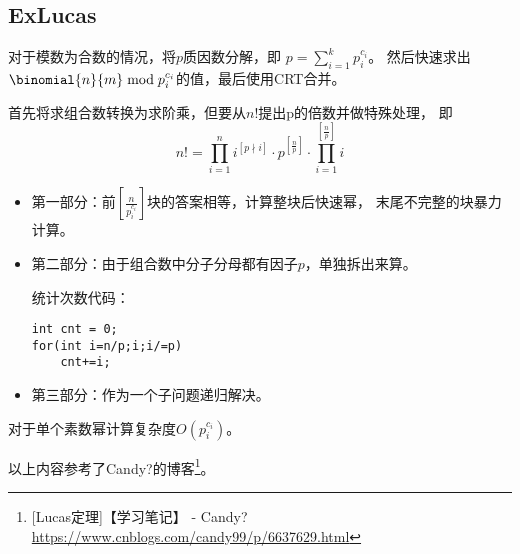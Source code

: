 \subsection{ExLucas}
对于模数为合数的情况，将$p$质因数分解，即
$\displaystyle p=\sum_{i=1}^k{p_i^{c_i}}$。
然后快速求出$\binomial{n}{m} \bmod{p_i^{c_i}}$的值，最后使用CRT合并。

首先将求组合数转换为求阶乘，但要从$n!$提出p的倍数并做特殊处理，
即\begin{displaymath}
	n!=\prod_{i=1}^n{i^{[p\nmid i]}}\cdot p^{[\frac{n}{p}]}\cdot
	\prod_{i=1}^{[\frac{n}{p}]}i
\end{displaymath}
\begin{itemize}
	\item 第一部分：前$[\frac{n}{p_i^{c_i}}]$块的答案相等，计算整块后快速幂，
	      末尾不完整的块暴力计算。
	\item 第二部分：由于组合数中分子分母都有因子$p$，单独拆出来算。

	统计次数代码：
\begin{lstlisting}
int cnt = 0;
for(int i=n/p;i;i/=p)
	cnt+=i;
\end{lstlisting}
	\item 第三部分：作为一个子问题递归解决。
\end{itemize}
对于单个素数幂计算复杂度$O(p_i^{c_i})$。

以上内容参考了Candy?的博客\footnote{[Lucas定理]【学习笔记】 - Candy?
	\url{https://www.cnblogs.com/candy99/p/6637629.html}}。
